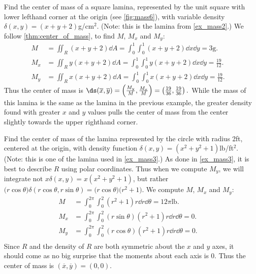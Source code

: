 \begin{example}\label{ex_mass7}
Find the center of mass of a square lamina, represented by the unit square with lower lefthand corner at the origin (see \autoref{fig:mass6}), with variable density $\delta(x,y) = (x+y+2)$g/cm$^2$. (Note: this is the lamina from \autoref{ex_mass2}.)
\solution
We follow \autoref{thm:center_of_mass}, to find $M$, $M_x$ and $M_y$:
\begin{align*}
M &= \iint_R (x+y+2)\dd A = \int_0^1\int_0^1 (x+y+2)\dd x\dd y =3\text{g}.\\
M_x &= \iint_R y(x+y+2)\dd A = \int_0^1\int_0^1 y(x+y+2)\dd x\dd y =\frac{19}{12}.\\
M_y &= \iint_R x(x+y+2)\dd A = \int_0^1\int_0^1 x(x+y+2)\dd x\dd y =\frac{19}{12}.
\end{align*}
Thus the center of mass is $\ds (\overline{x},\overline{y}) = \left(\frac{M_y}M,\frac{M_x}M\right) = \left(\frac{19}{36},\frac{19}{36}\right)%
.$ While the mass of this lamina is the same as the lamina in the previous example, the greater density found with greater $x$ and $y$ values pulls the center of mass from the center slightly towards the upper righthand corner.
\end{example}

\begin{example}\label{ex_mass8}
Find the center of mass of the lamina represented by the circle with radius 2ft, centered at the origin, with density function $\delta(x,y) = (x^2+y^2+1)$lb/ft$^2$. (Note: this is one of the lamina used in \autoref{ex_mass3}.)
\solution
As done in \autoref{ex_mass3}, it is best to describe $R$ using polar coordinates.
Thus when we compute $M_y$, we will integrate not $x\delta(x,y) = x(x^2+y^2+1)$, but rather $\bigl(r\cos\theta\bigr)\delta(r\cos\theta,r\sin\theta) = \bigl(r\cos\theta\bigr)\bigl(r^2+1\bigr).$ We compute $M$, $M_x$ and $M_y$:
\begin{align*}
M &= \int_0^{2\pi}\int_0^2 (r^2+1)r\dd r\dd\theta = 12\pi%
\text{lb}.\\
M_x &= \int_0^{2\pi}\int_0^2 (r\sin\theta)(r^2+1)r \dd r\dd\theta = 0.\\
M_y &= \int_0^{2\pi}\int_0^2 (r\cos\theta)(r^2+1)r \dd r\dd\theta = 0.\\
\end{align*}
Since $R$ and the density of $R$ are both symmetric about the $x$ and $y$ axes, it should come as no big surprise that the moments about each axis is 0. Thus the center of mass is $(\overline{x},\overline{y})=(0,0)$.
\end{example}

